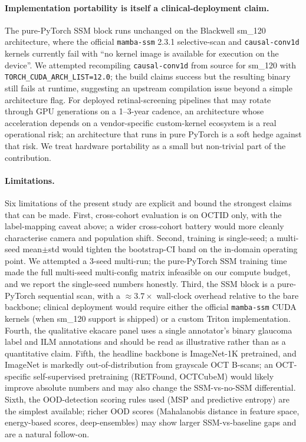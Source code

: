 \documentclass[5p]{elsarticle}
\begin{document}
\paragraph{Implementation portability is itself a clinical-deployment claim.}
The pure-PyTorch SSM block runs unchanged on the Blackwell sm\_120 architecture, where the official \texttt{mamba-ssm} 2.3.1 selective-scan and \texttt{causal-conv1d} kernels currently fail with ``no kernel image is available for execution on the device''. We attempted recompiling \texttt{causal-conv1d} from source for sm\_120 with \texttt{TORCH\_CUDA\_ARCH\_LIST=12.0}; the build claims success but the resulting binary still fails at runtime, suggesting an upstream compilation issue beyond a simple architecture flag. For deployed retinal-screening pipelines that may rotate through GPU generations on a 1--3-year cadence, an architecture whose acceleration depends on a vendor-specific custom-kernel ecosystem is a real operational risk; an architecture that runs in pure PyTorch is a soft hedge against that risk. We treat hardware portability as a small but non-trivial part of the contribution.

\paragraph{Limitations.}
Six limitations of the present study are explicit and bound the strongest claims that can be made.
First, cross-cohort evaluation is on OCTID only, with the label-mapping caveat above; a wider cross-cohort battery would more cleanly characterise camera and population shift.
Second, training is single-seed; a multi-seed mean$\pm$std would tighten the bootstrap-CI band on the in-domain operating point. We attempted a 3-seed multi-run; the pure-PyTorch SSM training time made the full multi-seed multi-config matrix infeasible on our compute budget, and we report the single-seed numbers honestly.
Third, the SSM block is a pure-PyTorch sequential scan, with a $\approx 3.7\times$ wall-clock overhead relative to the bare backbone; clinical deployment would require either the official \texttt{mamba-ssm} CUDA kernels (when sm\_120 support is shipped) or a custom Triton implementation.
Fourth, the qualitative ekacare panel uses a single annotator's binary glaucoma label and ILM annotations and should be read as illustrative rather than as a quantitative claim.
Fifth, the headline backbone is ImageNet-1K pretrained, and ImageNet is markedly out-of-distribution from grayscale OCT B-scans; an OCT-specific self-supervised pretraining (RETFound, OCTCubeM) would likely improve absolute numbers and may also change the SSM-vs-no-SSM differential.
Sixth, the OOD-detection scoring rules used (MSP and predictive entropy) are the simplest available; richer OOD scores (Mahalanobis distance in feature space, energy-based scores, deep-ensembles) may show larger SSM-vs-baseline gaps and are a natural follow-on.
\end{document}
